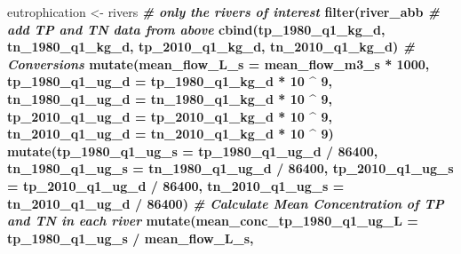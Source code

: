 \documentclass[
]{article}
\newenvironment{Shaded}{\begin{snugshade}}{\end{snugshade}}
\newcommand{\CommentTok}[1]{\textcolor[rgb]{0.56,0.35,0.01}{\textit{#1}}}
\newcommand{\DataTypeTok}[1]{\textcolor[rgb]{0.13,0.29,0.53}{#1}}
\newcommand{\DecValTok}[1]{\textcolor[rgb]{0.00,0.00,0.81}{#1}}
\newcommand{\KeywordTok}[1]{\textcolor[rgb]{0.13,0.29,0.53}{\textbf{#1}}}
\newcommand{\NormalTok}[1]{#1}
\newcommand{\OperatorTok}[1]{\textcolor[rgb]{0.81,0.36,0.00}{\textbf{#1}}}
\newcommand{\StringTok}[1]{\textcolor[rgb]{0.31,0.60,0.02}{#1}}
\begin{document}
\begin{Shaded}
\begin{Highlighting}[]
\NormalTok{eutrophication <-}\StringTok{ }\NormalTok{rivers }\OperatorTok{%>%}
\StringTok{  }\CommentTok{# only the rivers of interest}
\StringTok{  }\KeywordTok{filter}\NormalTok{(river_abb }\OperatorTok{%in%}\StringTok{ }\KeywordTok{c}\NormalTok{(}\StringTok{"SUS"}\NormalTok{, }\StringTok{"POT"}\NormalTok{, }\StringTok{"CHO"}\NormalTok{)) }\OperatorTok{%>%}
\StringTok{  }\CommentTok{# add TP and TN data from above}
\StringTok{  }\KeywordTok{cbind}\NormalTok{(tp_}\DecValTok{1980}\NormalTok{_q1_kg_d,}
\NormalTok{        tn_}\DecValTok{1980}\NormalTok{_q1_kg_d,}
\NormalTok{        tp_}\DecValTok{2010}\NormalTok{_q1_kg_d,}
\NormalTok{        tn_}\DecValTok{2010}\NormalTok{_q1_kg_d) }\OperatorTok{%>%}\StringTok{ }
\StringTok{  }\CommentTok{# Conversions}
\StringTok{  }\KeywordTok{mutate}\NormalTok{(}\DataTypeTok{mean_flow_L_s =}\NormalTok{ mean_flow_m3_s }\OperatorTok{*}\StringTok{ }\DecValTok{1000}\NormalTok{,}
         \DataTypeTok{tp_1980_q1_ug_d =}\NormalTok{ tp_}\DecValTok{1980}\NormalTok{_q1_kg_d }\OperatorTok{*}\StringTok{ }\DecValTok{10} \OperatorTok{^}\StringTok{ }\DecValTok{9}\NormalTok{,}
         \DataTypeTok{tn_1980_q1_ug_d =}\NormalTok{ tn_}\DecValTok{1980}\NormalTok{_q1_kg_d }\OperatorTok{*}\StringTok{ }\DecValTok{10} \OperatorTok{^}\StringTok{ }\DecValTok{9}\NormalTok{,}
         \DataTypeTok{tp_2010_q1_ug_d =}\NormalTok{ tp_}\DecValTok{2010}\NormalTok{_q1_kg_d }\OperatorTok{*}\StringTok{ }\DecValTok{10} \OperatorTok{^}\StringTok{ }\DecValTok{9}\NormalTok{,}
         \DataTypeTok{tn_2010_q1_ug_d =}\NormalTok{ tn_}\DecValTok{2010}\NormalTok{_q1_kg_d }\OperatorTok{*}\StringTok{ }\DecValTok{10} \OperatorTok{^}\StringTok{ }\DecValTok{9}\NormalTok{) }\OperatorTok{%>%}
\StringTok{  }\KeywordTok{mutate}\NormalTok{(}\DataTypeTok{tp_1980_q1_ug_s =}\NormalTok{ tp_}\DecValTok{1980}\NormalTok{_q1_ug_d }\OperatorTok{/}\StringTok{ }\DecValTok{86400}\NormalTok{,}
         \DataTypeTok{tn_1980_q1_ug_s =}\NormalTok{ tn_}\DecValTok{1980}\NormalTok{_q1_ug_d }\OperatorTok{/}\StringTok{ }\DecValTok{86400}\NormalTok{,}
         \DataTypeTok{tp_2010_q1_ug_s =}\NormalTok{ tp_}\DecValTok{2010}\NormalTok{_q1_ug_d }\OperatorTok{/}\StringTok{ }\DecValTok{86400}\NormalTok{,}
         \DataTypeTok{tn_2010_q1_ug_s =}\NormalTok{ tn_}\DecValTok{2010}\NormalTok{_q1_ug_d }\OperatorTok{/}\StringTok{ }\DecValTok{86400}\NormalTok{) }\OperatorTok{%>%}
\StringTok{  }\CommentTok{# Calculate Mean Concentration of TP and TN in each river}
\StringTok{  }\KeywordTok{mutate}\NormalTok{(}\DataTypeTok{mean_conc_tp_1980_q1_ug_L =}\NormalTok{ tp_}\DecValTok{1980}\NormalTok{_q1_ug_s }\OperatorTok{/}\StringTok{ }\NormalTok{mean_flow_L_s,}
}}}}}
\end{Highlighting}
\end{Shaded}
\end{document}
